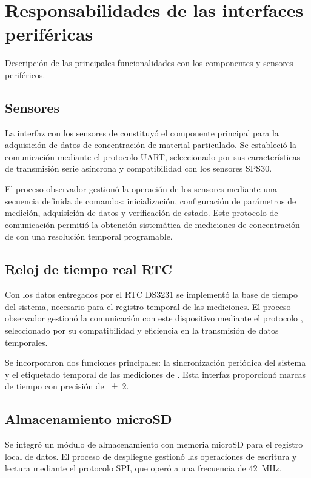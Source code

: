 \section{Responsabilidades de las interfaces periféricas}

Descripción de las principales funcionalidades con los componentes y sensores periféricos.

\subsection{Sensores \MPF}
La interfaz con los sensores de \MPF constituyó el componente principal para la adquisición de datos de concentración de material particulado. Se estableció la comunicación mediante el protocolo UART, seleccionado por sus características de transmisión serie asíncrona y compatibilidad con los sensores SPS30.

El proceso observador gestionó la operación de los sensores mediante una secuencia definida de comandos: inicialización, configuración de parámetros de medición, adquisición de datos y verificación de estado. Este protocolo de comunicación permitió la obtención sistemática de mediciones de concentración de \MPF con una resolución temporal programable.

\subsection{Reloj de tiempo real RTC}

Con los datos entregados por el RTC DS3231 se implementó la base de tiempo del sistema, necesario para el registro temporal de las mediciones. El proceso observador gestionó la comunicación con este dispositivo mediante el protocolo \IIC, seleccionado por su compatibilidad y eficiencia en la transmisión de datos temporales.

Se incorporaron dos funciones principales: la sincronización periódica del sistema y el etiquetado temporal de las mediciones de \MPF. Esta interfaz proporcionó marcas de tiempo con precisión de \SI{\pm2}{\ppm}.

\subsection{Almacenamiento microSD}

Se integró un módulo de almacenamiento con memoria microSD para el registro local de datos. El proceso de despliegue gestionó las operaciones de escritura y lectura mediante el protocolo SPI, que operó a una frecuencia de \SI{42}{\mega\hertz}.

